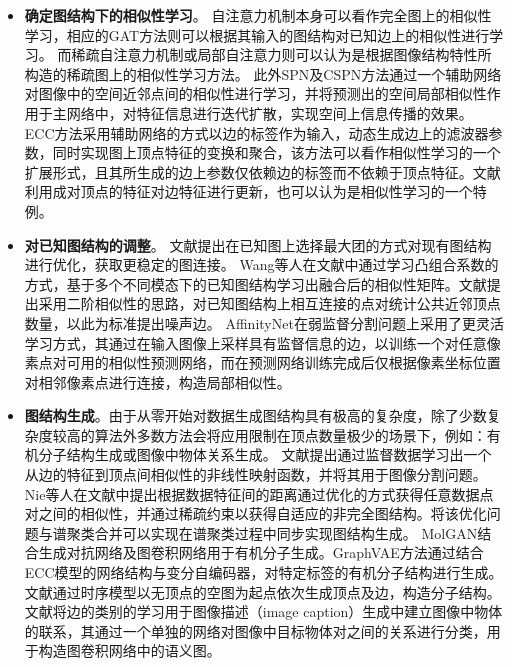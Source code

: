 \begin{itemize}
    \item {\bf{确定图结构下的相似性学习}}。
    自注意力机制\cite{vaswani2017attention,wang2018non}本身可以看作完全图上的相似性学习，相应的GAT方法\cite{velivckovic2017graph}则可以根据其输入的图结构对已知边上的相似性进行学习。
    而稀疏自注意力机制\cite{child2019generating,huang2019interlaced}或局部自注意力\cite{ramachandran2019stand}则可以认为是根据图像结构特性所构造的稀疏图上的相似性学习方法。
    此外SPN\cite{liu2017learning}及CSPN\cite{cheng2018depth}方法通过一个辅助网络对图像中的空间近邻点间的相似性进行学习，并将预测出的空间局部相似性作用于主网络中，对特征信息进行迭代扩散，实现空间上信息传播的效果。
    ECC方法\cite{simonovsky2017dynamic}采用辅助网络的方式以边的标签作为输入，动态生成边上的滤波器参数，同时实现图上顶点特征的变换和聚合，该方法可以看作相似性学习的一个扩展形式，且其所生成的边上参数仅依赖边的标签而不依赖于顶点特征。文献\parencite{kearnes2016molecular}利用成对顶点的特征对边特征进行更新，也可以认为是相似性学习的一个特例。    
    \item {\bf{对已知图结构的调整}}。
    文献\parencite{pavan2007dominant}提出在已知图上选择最大团的方式对现有图结构进行优化，获取更稳定的图连接。
    Wang等人在文献\parencite{wang2009unified}中通过学习凸组合系数的方式，基于多个不同模态下的已知图结构学习出融合后的相似性矩阵。文献\parencite{premachandran2013consensus}提出采用二阶相似性的思路，对已知图结构上相互连接的点对统计公共近邻顶点数量，以此为标准提出噪声边。
    AffinityNet\cite{ahn2018learning}在弱监督分割问题上采用了更灵活学习方式，其通过在输入图像上采样具有监督信息的边，以训练一个对任意像素点对可用的相似性预测网络，而在预测网络训练完成后仅根据像素坐标位置对相邻像素点进行连接，构造局部相似性。    
    \item {\bf{图结构生成}}。由于从零开始对数据生成图结构具有极高的复杂度，除了少数复杂度较高的算法外多数方法会将应用限制在顶点数量极少的场景下，例如：有机分子结构生成或图像中物体关系生成。
    文献\cite{meila2001learning}提出通过监督数据学习出一个从边的特征到顶点间相似性的非线性映射函数，并将其用于图像分割问题。
    Nie等人在文献\cite{nie2014clustering}中提出根据数据特征间的距离通过优化的方式获得任意数据点对之间的相似性，并通过稀疏约束以获得自适应的非完全图结构。将该优化问题与谱聚类合并可以实现在谱聚类过程中同步实现图结构生成。
    MolGAN\cite{de2018molgan}结合生成对抗网络\cite{goodfellow2014generative}及图卷积网络\cite{kipf2016semi}用于有机分子生成。GraphVAE方法\cite{simonovsky2018graphvae}通过结合ECC模型\cite{simonovsky2017dynamic}的网络结构与变分自编码器，对特定标签的有机分子结构进行生成。文献\parencite{li2018learning}通过时序模型以无顶点的空图为起点依次生成顶点及边，构造分子结构。文献\parencite{yao2018exploring}将边的类别的学习用于图像描述（image caption）生成中建立图像中物体的联系，其通过一个单独的网络对图像中目标物体对之间的关系进行分类，用于构造图卷积网络中的语义图。
\end{itemize}


